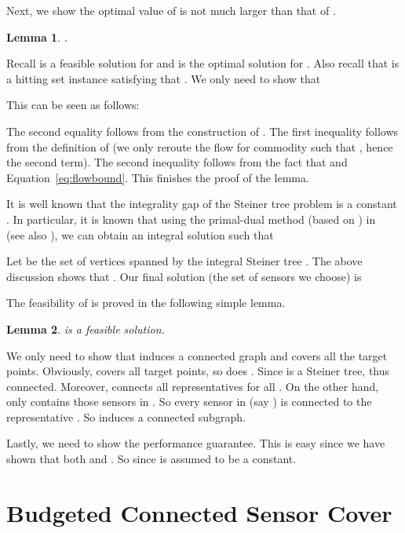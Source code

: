 \documentclass[11pt]{article}
\newenvironment{proof}{\noindent {\em Proof: }\ignorespaces}{}
\newcommand{\qed}{\hspace*{\fill}\medskip}
\newtheorem{lemma}{Lemma}
\begin{document}
Next, we show the optimal value of 
is not much larger than that of .

\begin{lemma}
	\label{lm:steiner}
	.
\end{lemma}
\begin{proof}
	Recall  is a feasible solution for  and  is the optimal solution for . Also recall that  is a hitting set instance satisfying that .
	We only need to show that 
	
	This can be seen as follows:
	
	
	
	The second equality follows from the construction of . The first inequality follows from the definition of  (we only reroute the flow for commodity  such that , hence the second term). The second inequality follows from the fact that  and Equation~\eqref{eq:flowbound}.
	This finishes the proof of the lemma.
	\qed
\end{proof}


It is well known that the integrality gap of the Steiner tree problem is a constant \cite{williamson2011design}.
In particular, it is known that using the primal-dual method (based on ) in~\cite{goemans1995general}
(see also \cite[Chapter 7.2]{williamson2011design}),
we can obtain an integral solution  such that

Let  be the set of vertices spanned by the integral Steiner tree .
The above discussion shows that .
Our final solution (the set of sensors we choose) is

The feasibility of  is proved in the following simple lemma.
\begin{lemma}
	 is a feasible solution.
	\label{lm:final1}
\end{lemma}
\begin{proof}
	We only need to show that 
	induces a connected graph and covers all the target points.
	Obviously,  covers all target points, so does .
	Since  is a Steiner tree, thus connected. Moreover,  connects
	all representatives  for all . On the other hand,
	 only contains those sensors in .
	So every sensor in  (say ) is connected to the representative .
	So  induces a connected subgraph.
	\qed
\end{proof}

Lastly, we need to show the performance guarantee.
This is easy since we have shown that
both  and .
So  since  is assumed to be a constant.

\section{Budgeted Connected Sensor Cover}
\label{sec:bcsc}
\end{document}
